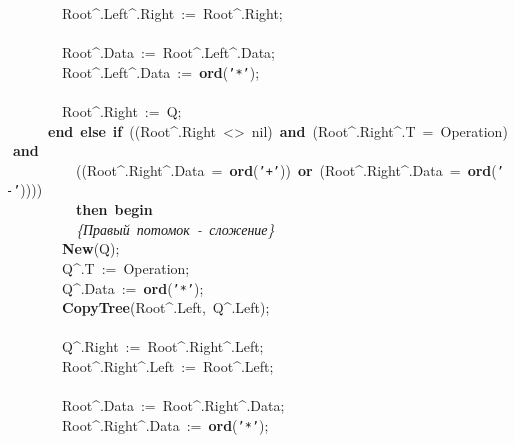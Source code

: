 \mbox{}\ \ \ \ \ \ \ \ Root\textasciicircum{}.Left\textasciicircum{}.Right\ :=\ Root\textasciicircum{}.Right; \\
\mbox{} \\
\mbox{}\ \ \ \ \ \ \ \ Root\textasciicircum{}.Data\ :=\ Root\textasciicircum{}.Left\textasciicircum{}.Data; \\
\mbox{}\ \ \ \ \ \ \ \ Root\textasciicircum{}.Left\textasciicircum{}.Data\ :=\ \textbf{ord}(\texttt{'*'}); \\
\mbox{} \\
\mbox{}\ \ \ \ \ \ \ \ Root\textasciicircum{}.Right\ :=\ Q; \\
\mbox{}\ \ \ \ \ \ \textbf{end}\ \textbf{else}\ \textbf{if}\ ((Root\textasciicircum{}.Right\ \textless{}\textgreater{}\ nil)\ \textbf{and}\ (Root\textasciicircum{}.Right\textasciicircum{}.T\ =\ Operation)\ \textbf{and} \\
\mbox{}\ \ \ \ \ \ \ \ \ \ ((Root\textasciicircum{}.Right\textasciicircum{}.Data\ =\ \textbf{ord}(\texttt{'+'}))\ \textbf{or}\ (Root\textasciicircum{}.Right\textasciicircum{}.Data\ =\ \textbf{ord}(\texttt{'-'})))) \\
\mbox{}\ \ \ \ \ \ \ \ \ \ \textbf{then}\ \textbf{begin} \\
\mbox{}\ \ \ \ \ \ \ \ \ \ \textit{\{Правый\ потомок\ -\ сложение\}} \\
\mbox{}\ \ \ \ \ \ \ \ \textbf{New}(Q); \\
\mbox{}\ \ \ \ \ \ \ \ Q\textasciicircum{}.T\ :=\ Operation; \\
\mbox{}\ \ \ \ \ \ \ \ Q\textasciicircum{}.Data\ :=\ \textbf{ord}(\texttt{'*'}); \\
\mbox{}\ \ \ \ \ \ \ \ \textbf{CopyTree}(Root\textasciicircum{}.Left,\ Q\textasciicircum{}.Left); \\
\mbox{} \\
\mbox{}\ \ \ \ \ \ \ \ Q\textasciicircum{}.Right\ :=\ Root\textasciicircum{}.Right\textasciicircum{}.Left; \\
\mbox{}\ \ \ \ \ \ \ \ Root\textasciicircum{}.Right\textasciicircum{}.Left\ :=\ Root\textasciicircum{}.Left; \\
\mbox{} \\
\mbox{}\ \ \ \ \ \ \ \ Root\textasciicircum{}.Data\ :=\ Root\textasciicircum{}.Right\textasciicircum{}.Data; \\
\mbox{}\ \ \ \ \ \ \ \ Root\textasciicircum{}.Right\textasciicircum{}.Data\ :=\ \textbf{ord}(\texttt{'*'}); \\
\mbox{} \\
